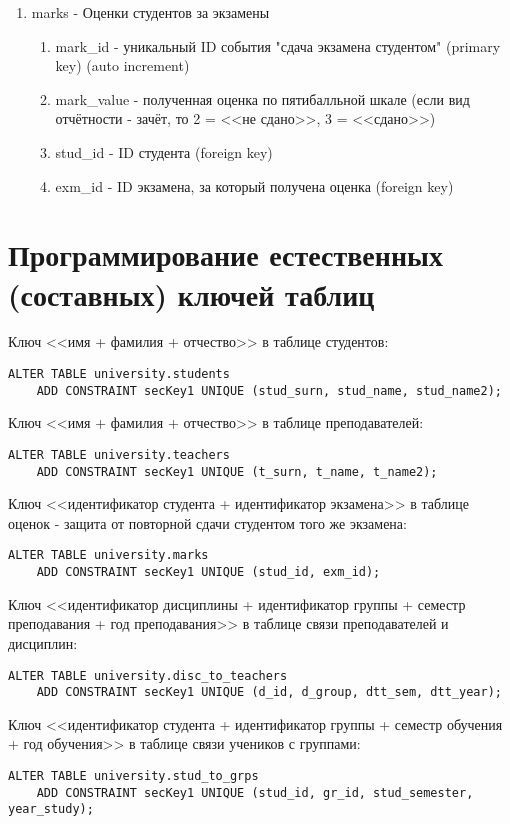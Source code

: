 \documentclass[zuevDbReport.tex]{subfiles}
\begin{document}
\begin{enumerate}
\item{}marks - Оценки студентов за экзамены
	\begin{enumerate}
	\item{}mark\_id - уникальный ID события "сдача экзамена студентом" (primary key) (auto increment)
	\item{}mark\_value - полученная оценка по пятибалльной шкале (если вид отчётности -  зачёт, то 2 = <<не сдано>>, 3 = <<сдано>>)
	\item{}stud\_id - ID студента (foreign key)
	\item{}exm\_id - ID экзамена, за который получена оценка (foreign key)
	\end{enumerate}
\end{enumerate}

\newpage
\section{Программирование естественных (составных) ключей таблиц}

Ключ <<имя + фамилия + отчество>> в таблице студентов:
\begin{lstlisting}
ALTER TABLE university.students
	ADD CONSTRAINT secKey1 UNIQUE (stud_surn, stud_name, stud_name2);
\end{lstlisting}
Ключ <<имя + фамилия + отчество>> в таблице преподавателей:
\begin{lstlisting}
ALTER TABLE university.teachers
	ADD CONSTRAINT secKey1 UNIQUE (t_surn, t_name, t_name2);
\end{lstlisting}
Ключ <<идентификатор студента + идентификатор экзамена>> в таблице оценок - защита от повторной сдачи студентом того же экзамена:
\begin{lstlisting}
ALTER TABLE university.marks
	ADD CONSTRAINT secKey1 UNIQUE (stud_id, exm_id);
\end{lstlisting}
Ключ <<идентификатор дисциплины + идентификатор группы + семестр преподавания + год преподавания>> в таблице связи преподавателей и дисциплин:
\begin{lstlisting}
ALTER TABLE university.disc_to_teachers
	ADD CONSTRAINT secKey1 UNIQUE (d_id, d_group, dtt_sem, dtt_year);
\end{lstlisting}
Ключ <<идентификатор студента + идентификатор группы + семестр обучения + год обучения>> в таблице связи учеников с группами:
\begin{lstlisting}
ALTER TABLE university.stud_to_grps
	ADD CONSTRAINT secKey1 UNIQUE (stud_id, gr_id, stud_semester, year_study);
\end{lstlisting}
\end{document}
